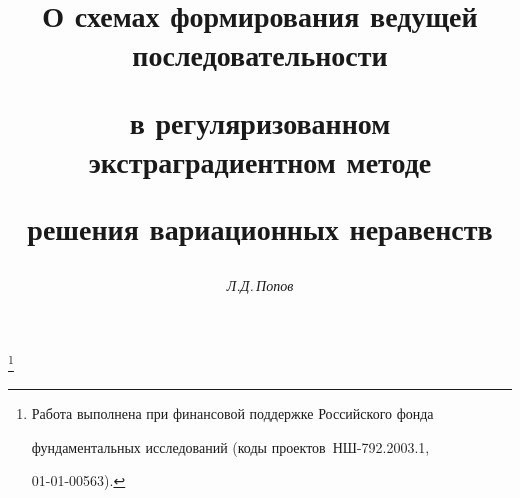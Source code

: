\renewcommand{\thenotenonum}{}







\setcounter{page}{70}

















\author{\it Л.Д.\,Попов}




\title{О схемах формирования ведущей последовательности 


в регуляризованном экстраградиентном методе


решения вариационных неравенств}


\thanks{Работа выполнена при финансовой поддержке Российского фонда


фундаментальных исследований (коды проектов \No\No\,НШ-792.2003.1,


01-01-00563).}





\date{}




\pagestyle{plain} %







\maketitle


\label{begin}




















